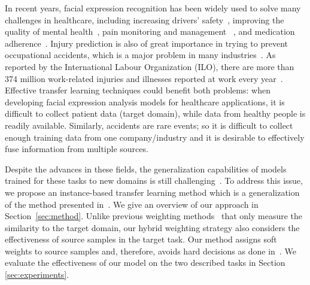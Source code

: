 \documentclass{article}
\begin{document}
In recent years, facial expression recognition has been widely used to solve many challenges in healthcare, including increasing drivers' safety~\cite{McDuff_2013_CVPR_Workshops}, improving the quality of mental health~\cite{mcclure2003facial},  pain monitoring and management ~\cite{ashraf2009painful}, and medication adherence~\cite{hanina2012method}. Injury prediction is also of great importance in trying to prevent occupational accidents, which is a major problem in many industries~\cite{ILO, sarkaretal, rossi2017effective}. As reported by the International Labour Organization (ILO), there are more than 374 million work-related injuries and illnesses reported at work every year~\cite{ILO}. Effective transfer learning techniques could benefit both problems: when developing facial expression analysis models for healthcare applications, it is difficult to collect patient data (target domain), while data from healthy people is readily available. Similarly, accidents are rare events; so it is difficult to collect enough training data from one company/industry and it is desirable to effectively fuse information from multiple sources. 

Despite the advances in these fields, the generalization capabilities of models trained for these tasks to new domains is still challenging~\cite{Bayesian_AAM, asgarian2017subspace, haase2014instance}. To address this issue, we propose an instance-based transfer learning method which is a generalization of the method presented in~\cite{huang2007correcting}. We give an overview of our approach in Section~\ref{sec:method}. Unlike previous weighting methods~\cite{haase2014instance} that only measure the similarity to the target domain, our hybrid weighting strategy also considers the effectiveness of source samples in the target task. Our method assigns soft weights to source samples and, therefore, avoids hard decisions as done in~\cite{gong2013connecting}. We evaluate the effectiveness of our model on the two described tasks in Section \ref{sec:experiments}.
\end{document}
